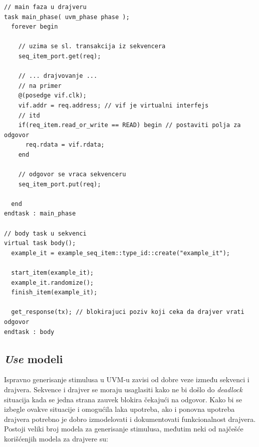 \begin{lstlisting}
// main faza u drajveru
task main_phase( uvm_phase phase );
  forever begin

    // uzima se sl. transakcija iz sekvencera
    seq_item_port.get(req);
 
    // ... drajvovanje ...
    // na primer
    @(posedge vif.clk);
    vif.addr = req.address; // vif je virtualni interfejs
    // itd
    if(req_item.read_or_write == READ) begin // postaviti polja za odgovor
      req.rdata = vif.rdata;
    end

    // odgovor se vraca sekvenceru
    seq_item_port.put(req);

  end
endtask : main_phase

// body task u sekvenci
virtual task body();
  example_it = example_seq_item::type_id::create("example_it");

  start_item(example_it);
  example_it.randomize();
  finish_item(example_it);

  get_response(tx); // blokirajuci poziv koji ceka da drajver vrati odgovor
endtask : body
\end{lstlisting}


\subsection{\emph{Use} modeli}

Ispravno generisanje stimulusa u UVM-u zavisi od dobre veze između sekvenci i
drajvera. Sekvence i drajver se moraju usaglasiti kako ne bi došlo do
\emph{deadlock} situacija kada se jedna strana zauvek blokira čekajući na
odgovor. Kako bi se izbegle ovakve situacije i omogućila laka upotreba, ako i
ponovna upotreba drajvera potrebno je dobro izmodelovati i dokumentovati
funkcionalnost drajvera. Postoji veliki broj modela za generisanje stimulusa,
međutim neki od najčešće korišćenjih modela za drajvere su:

